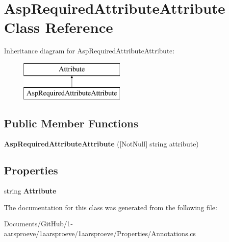 \hypertarget{class_asp_required_attribute_attribute}{}\section{Asp\+Required\+Attribute\+Attribute Class Reference}
\label{class_asp_required_attribute_attribute}
Inheritance diagram for Asp\+Required\+Attribute\+Attribute\+:\begin{figure}[H]
\begin{center}
\leavevmode
\includegraphics[height=2.000000cm]{class_asp_required_attribute_attribute}
\end{center}
\end{figure}
\subsection*{Public Member Functions}
\begin{DoxyCompactItemize}
\item 
\hypertarget{class_asp_required_attribute_attribute_a37e197f5a5990c0140d0dc75be9ad6a6}{}{\bfseries Asp\+Required\+Attribute\+Attribute} (\mbox{[}Not\+Null\mbox{]} string attribute)\label{class_asp_required_attribute_attribute_a37e197f5a5990c0140d0dc75be9ad6a6}

\end{DoxyCompactItemize}
\subsection*{Properties}
\begin{DoxyCompactItemize}
\item 
\hypertarget{class_asp_required_attribute_attribute_a8d782b24a958ba36ee4d63265a5db96d}{}string {\bfseries Attribute}\label{class_asp_required_attribute_attribute_a8d782b24a958ba36ee4d63265a5db96d}

\end{DoxyCompactItemize}


The documentation for this class was generated from the following file\+:\begin{DoxyCompactItemize}
\item 
Documents/\+Git\+Hub/1-\/aarsproeve/1aarsproeve/1aarsproeve/\+Properties/Annotations.\+cs\end{DoxyCompactItemize}
